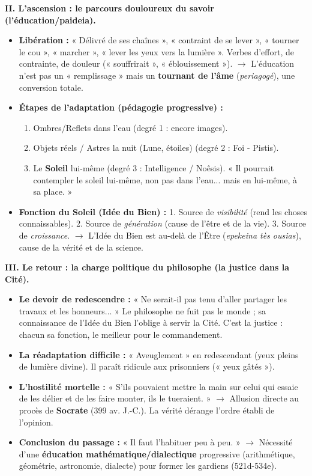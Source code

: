 \documentclass[11pt]{article}
\newcommand{\cle}[1]{{\popxbold\color{popdark}#1}}
\begin{document}
\begin{exoresolu}
\textbf{II. L'ascension : le parcours douloureux du savoir (l'éducation/paideia).}
\begin{itemize}
    \item \textbf{Libération :} « Délivré de ses chaînes », « contraint de se lever », « tourner le cou », « marcher », « lever les yeux vers la lumière ». Verbes d'effort, de contrainte, de douleur (« souffrirait », « éblouissement »). $\rightarrow$ L'éducation n'est pas un « remplissage » mais un \textbf{tournant de l'âme} (\emph{periagogè}), une conversion totale.
    \item \textbf{Étapes de l'adaptation (pédagogie progressive) :}
        \begin{enumerate}
            \item Ombres/Reflets dans l'eau (degré 1 : encore images).
            \item Objets réels / Astres la nuit (Lune, étoiles) (degré 2 : \cle{Foi - Pistis}).
            \item Le \textbf{Soleil} lui-même (degré 3 : \cle{Intelligence / Noêsis}). « Il pourrait contempler le soleil lui-même, non pas dans l'eau... mais en lui-même, à sa place. »
        \end{enumerate}
    \item \textbf{Fonction du Soleil (Idée du Bien) :} 1. Source de \emph{visibilité} (rend les choses connaissables). 2. Source de \emph{génération} (cause de l'être et de la vie). 3. Source de \emph{croissance}. $\rightarrow$ L'Idée du Bien est au-delà de l'Être (\emph{epekeina tès ousias}), cause de la vérité et de la science.
\end{itemize}

\textbf{III. Le retour : la charge politique du philosophe (la justice dans la Cité).}
\begin{itemize}
    \item \textbf{Le devoir de redescendre :} « Ne serait-il pas tenu d'aller partager les travaux et les honneurs... » Le philosophe ne fuit pas le monde ; sa connaissance de l'Idée du Bien l'oblige à servir la Cité. C'est la \cle{justice} : chacun sa fonction, le meilleur pour le commandement.
    \item \textbf{La réadaptation difficile :} « Aveuglement » en redescendant (yeux pleins de lumière divine). Il paraît ridicule aux prisonniers (« yeux gâtés »).
    \item \textbf{L'hostilité mortelle :} « S'ils pouvaient mettre la main sur celui qui essaie de les délier et de les faire monter, ils le tueraient. » $\rightarrow$ Allusion directe au procès de \textbf{Socrate} (399 av. J.-C.). La vérité dérange l'ordre établi de l'opinion.
    \item \textbf{Conclusion du passage :} « Il faut l'habituer peu à peu. » $\rightarrow$ Nécessité d'une \textbf{éducation mathématique/dialectique} progressive (arithmétique, géométrie, astronomie, dialecte) pour former les gardiens (521d-534e).
\end{itemize}


\end{exoresolu}
\end{document}
